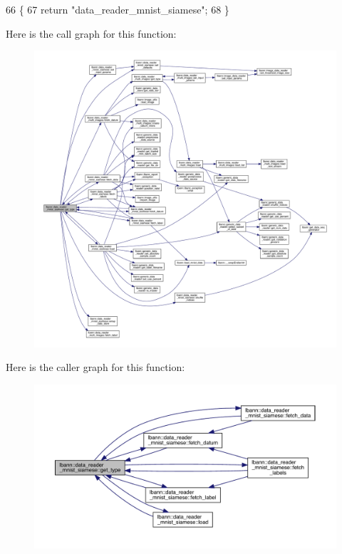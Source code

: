\begin{DoxyCode}
66                                       \{
67     \textcolor{keywordflow}{return} \textcolor{stringliteral}{"data\_reader\_mnist\_siamese"};
68   \}
\end{DoxyCode}
Here is the call graph for this function\+:\nopagebreak
\begin{figure}[H]
\begin{center}
\leavevmode
\includegraphics[width=350pt]{classlbann_1_1data__reader__mnist__siamese_a2c5a29603f850bb0684dba1c64981604_cgraph}
\end{center}
\end{figure}
Here is the caller graph for this function\+:\nopagebreak
\begin{figure}[H]
\begin{center}
\leavevmode
\includegraphics[width=350pt]{classlbann_1_1data__reader__mnist__siamese_a2c5a29603f850bb0684dba1c64981604_icgraph}
\end{center}
\end{figure}
\mbox{\label{classlbann_1_1data__reader__mnist__siamese_a2c60a89c5815fa24b34d4febfecfc3db}} 
